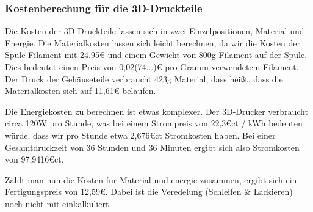 \subsubsection{Kostenberechung für die 3D-Druckteile}
Die Kosten der 3D-Druckteile lassen sich in zwei Einzelpositionen, Material und Energie. Die Materialkosten lassen sich leicht berechnen, da wir die Kosten der Spule Filament mit 24.95\euro{} und einem Gewicht von 800g Filament auf der Spule. Dies bedeutet einen Preis von 0,02(74...)\euro{} pro Gramm verwendetem Filament. Der Druck der Gehäuseteile verbraucht 423g Material, dass heißt, dass die Materialkosten sich auf 11,61\euro{} belaufen.\par
Die Energiekosten zu berechnen ist etwas komplexer. Der 3D-Drucker verbraucht circa 120W pro Stunde, was bei einem Strompreis von 22,3\euro{}ct / kWh bedeuten würde, dass wir pro Stunde etwa 2,676\euro{}ct Stromkosten haben. Bei einer Gesamtdruckzeit von 36 Stunden und 36 Minuten ergibt sich also Stromkosten von 97,9416\euro{}ct.\par
Zählt man nun die Kosten für Material und energie zusammen, ergibt sich ein Fertigungspreis von 12,59\euro{}. Dabei ist die Veredelung (Schleifen \& Lackieren) noch nicht mit einkalkuliert.\par